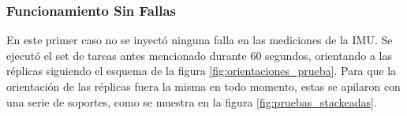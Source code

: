 
\subsubsection{Funcionamiento Sin Fallas}


En este primer caso no se inyectó ninguna falla en las mediciones de la IMU. Se ejecutó el set de tareas antes mencionado durante 60 segundos, orientando a las réplicas siguiendo el esquema de la figura \ref{fig:orientaciones_prueba}. Para que la orientación de las réplicas fuera la misma en todo momento, estas se apilaron con una serie de soportes, como se muestra en la figura \ref{fig:pruebas_stackeadas}.

